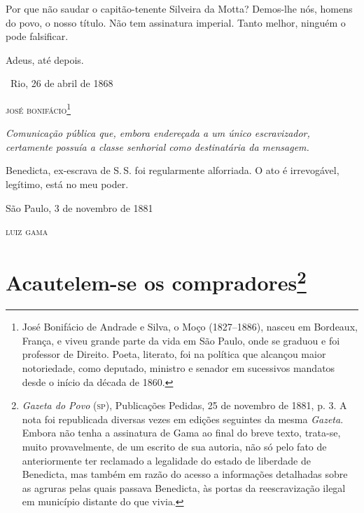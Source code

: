 Por que não saudar o capitão-tenente Silveira da Motta? Demos-lhe nós,
homens do povo, o nosso título. Não tem assinatura imperial. Tanto
melhor, ninguém o pode falsificar.

Adeus, até depois.\medskip

\hfill\ Rio, 26 de abril de 1868

\hfill\textsc{josé bonifácio}\footnote{José Bonifácio de Andrade e Silva, o Moço
  (1827--1886), nasceu em Bordeaux, França, e viveu grande parte da vida
  em São Paulo, onde se graduou e foi professor de Direito. Poeta,
  literato, foi na política que alcançou maior notoriedade, como
  deputado, ministro e senador em sucessivos mandatos desde o início da
  década de 1860.}


\begin{resumo}
\emph{Comunicação pública que, embora endereçada a um único
escravizador, certamente possuía a classe senhorial como destinatária da
mensagem.}
\end{resumo}

Benedicta, ex-escrava de S.\,S. foi regularmente alforriada. O ato é
irrevogável, legítimo, está no meu poder.

\medskip

\hfill São Paulo, 3 de novembro de 1881

\hfill\textsc{luiz gama}

\chapter{Acautelem-se os compradores\footnote{\emph{Gazeta do Povo} (\textsc{sp}), Publicações
  Pedidas, 25 de novembro de 1881, p. 3. A nota foi republicada diversas vezes em
  edições seguintes da mesma \emph{Gazeta}. Embora não tenha a
  assinatura de Gama ao final do breve texto, trata-se, muito
  provavelmente, de um escrito de sua autoria, não só pelo fato de
  anteriormente ter reclamado a legalidade do estado de liberdade de
  Benedicta, mas também em razão do acesso a informações detalhadas
  sobre as agruras pelas quais passava Benedicta, às portas da
  reescravização ilegal em município distante do que vivia.}}

